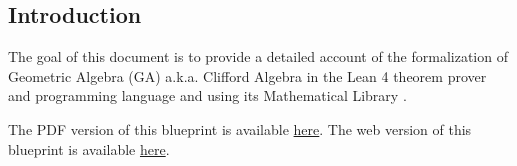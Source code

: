 \subsection*{Introduction}
\label{sec:intro}

The goal of this document is to provide a detailed account
of the formalization of Geometric Algebra (GA) a.k.a. Clifford Algebra \cite{hestenes2012clifford}
in the Lean 4 theorem prover and programming language \cite{moura2021lean, lean_2015, ullrich2023extensible}
and using its Mathematical Library \Mathlib \cite{themathlibcommunityLeanMathematicalLibrary2020}.

\ifplastex
The PDF version of this blueprint is available \href{./blueprint.pdf}{here}.
\else
The web version of this blueprint is available \href{https://utensil.github.io/lean-ga/blueprint/}{here}.
\fi





